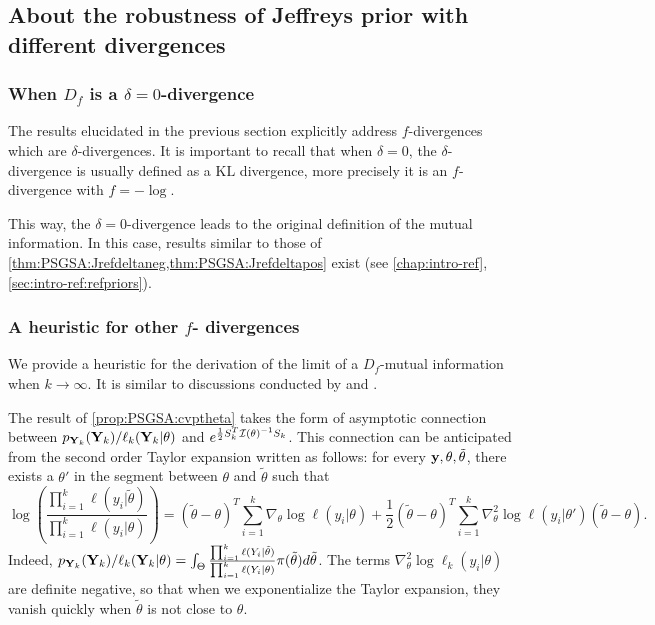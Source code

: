 

    \subsection{About the robustness of Jeffreys prior with different divergences}


        \subsubsection{When $D_f$ is a $\delta=0$-divergence}

        The results elucidated in the previous section %
        explicitly address $f$-divergences which are $\delta$-divergences.
        It is important to recall that when $\delta=0$, the $\delta$-divergence is usually defined as a  $\text{KL}$ divergence, more precisely it is an $f$-divergence with $f=-\log$.

        This way, the $\delta=0$-divergence leads to the original definition of the mutual information.
        In this case, 
        results similar to those of \cref{thm:PSGSA:Jrefdeltaneg,thm:PSGSA:Jrefdeltapos} exist (see \cref{chap:intro-ref}, \cref{sec:intro-ref:refpriors}). 
        



        \subsubsection{A heuristic for other $f$- divergences}

        We provide a heuristic for the derivation of the limit of a $D_f$-mutual information when $k\to\infty$. It is similar to discussions conducted by \citet{mure_objective_2018} and \citet{xie_minimax_1997}.

        The result of \cref{prop:PSGSA:cvptheta} takes the form of asymptotic connection between $p_{\mathbf{Y}_k}(\mathbf{Y}_k)/\ell_k(\mathbf{Y}_k|\theta) $ and $e^{\frac{1}{2}S_k^T\mathcal{I}(\theta)^{-1}S_k}$. This connection can be anticipated from the second order Taylor expansion written as follows: for every $\mathbf{y},\theta, \tilde\theta$, there exists a $\theta'$ in the segment between $\theta$ and $\tilde\theta$ such that
        \begin{equation}
            \log\left(\frac{\prod_{i=1}^k \ell(y_i|\tilde\theta)}{\prod_{i=1}^k \ell(y_i|\theta)}\right) = (\tilde\theta-\theta)^T\sum_{i=1}^k\nabla_\theta\log \ell(y_i|\theta) +\frac{1}{2}(\tilde\theta-\theta)^T\sum_{i=1}^k\nabla_\theta^2\log \ell(y_i|\theta')(\tilde\theta-\theta).
        \end{equation}
        Indeed, $p_{\mathbf{Y}_k}(\mathbf{Y}_k)/\ell_k(\mathbf{Y}_k|\theta) = \int_\Theta \frac{\prod_{i=1}^k \ell(Y_i|\tilde\theta)}{\prod_{i=1}^k \ell(Y_i|\theta)} \pi(\tilde\theta)d\tilde\theta$.
        The terms $\nabla_\theta^2\log\ell_k(y_i|\theta)$ are definite negative, so that when we exponentialize the Taylor expansion, they vanish quickly when $\tilde\theta$ is not close to $\theta$.
        
